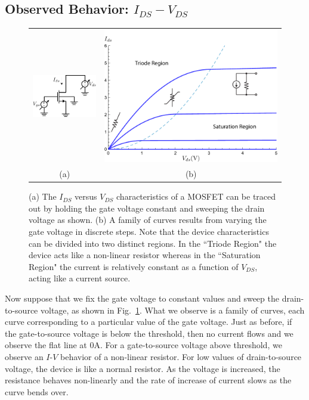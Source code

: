 \subsection{Observed Behavior: \texorpdfstring{$I_{DS} - V_{DS}$}{Drain Current vs. Drain Voltage}}
\begin{figure}[tb]
\centering
\begin{tabular}{cc}
\includegraphics[width=.3\columnwidth]{idvds_sweep} &
\includegraphics[width=.6\columnwidth]{ids_vds}\\
(a) & (b)\\
\end{tabular}
\caption{(a) The $I_{DS}$ versus $V_{DS}$ characteristics of a MOSFET can be traced out by holding the gate voltage constant and sweeping the drain voltage as shown.  (b) A family of curves results from varying the gate voltage in discrete steps.  Note that the device characteristics can be divided into two distinct regions.  In the ``Triode Region" the device acts like a non-linear resistor whereas in the ``Saturation Region" the current is relatively constant as a function of $V_{DS}$, acting like a current source.}
\label{fig:ids_vds}
\end{figure}
Now suppose that we fix the gate voltage to constant values and sweep the drain-to-source voltage, as shown in Fig.~\ref{fig:ids_vds}.  What we observe is a family of curves, each curve corresponding to a particular value of the gate voltage.  Just as before, if the gate-to-source voltage is below the threshold, then no current flows and we observe the flat line at $0$A. For a gate-to-source voltage above threshold, we observe an $I$-$V$ behavior of a non-linear resistor.  For low values of drain-to-source voltage, the device is like a normal resistor. As the voltage is increased, the resistance behaves non-linearly and the rate of increase of current slows as the curve bends over.  
